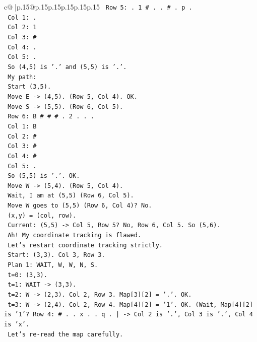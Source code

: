 \documentclass{article}
\begin{document}
{\begin{supertabular}{c@{$\;$}|p{.15\linewidth}@{}p{.15\linewidth}p{.15\linewidth}p{.15\linewidth}p{.15\linewidth}p{.15\linewidth}}
{{{\texttt{  Row 5: . 1 \# . . \# . p .} \\
\texttt{  Col 1: .} \\
\texttt{  Col 2: 1} \\
\texttt{  Col 3: \#} \\
\texttt{  Col 4: .} \\
\texttt{  Col 5: .} \\
\texttt{  So (4,5) is '.' and (5,5) is '.'.} \\
\texttt{  My path:} \\
\texttt{  Start (3,5).} \\
\texttt{  Move E {-}> (4,5). (Row 5, Col 4). OK.} \\
\texttt{  Move S {-}> (5,5). (Row 6, Col 5).} \\
\texttt{  Row 6: B \# \# \# . 2 . . .} \\
\texttt{  Col 1: B} \\
\texttt{  Col 2: \#} \\
\texttt{  Col 3: \#} \\
\texttt{  Col 4: \#} \\
\texttt{  Col 5: .} \\
\texttt{  So (5,5) is '.'. OK.} \\
\texttt{  Move W {-}> (5,4). (Row 5, Col 4).} \\
\texttt{  Wait, I am at (5,5) (Row 6, Col 5).} \\
\texttt{  Move W goes to (5,5) (Row 6, Col 4)? No.} \\
\texttt{  (x,y) = (col, row).} \\
\texttt{  Current: (5,5) {-}> Col 5, Row 5? No, Row 6, Col 5. So (5,6).} \\
\texttt{  Ah! My coordinate tracking is flawed.} \\
\texttt{  Let's restart coordinate tracking strictly.} \\
\texttt{  Start: (3,3). Col 3, Row 3.} \\
\texttt{  Plan 1: WAIT, W, W, N, S.} \\
\texttt{  t=0: (3,3).} \\
\texttt{  t=1: WAIT {-}> (3,3).} \\
\texttt{  t=2: W {-}> (2,3). Col 2, Row 3. Map{[}3{]}{[}2{]} = '.'. OK.} \\
\texttt{  t=3: W {-}> (2,4). Col 2, Row 4. Map{[}4{]}{[}2{]} = '1'. OK. (Wait, Map{[}4{]}{[}2{]} is '1'? Row 4: \# . . x . . q . | {-}> Col 2 is '.', Col 3 is '.', Col 4 is 'x'.} \\
\texttt{  Let's re{-}read the map carefully.} \\
}}}
\end{supertabular}}
\end{document}
